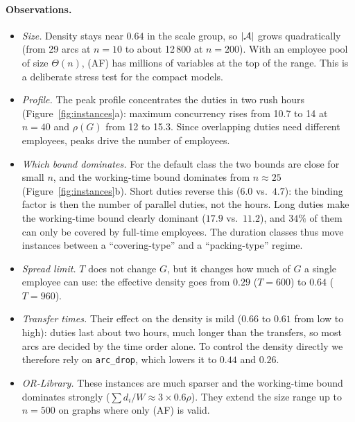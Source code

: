 \paragraph{Observations.}
\begin{itemize}
  \item \emph{Size.} Density stays near $0.64$ in the scale group, so
    $|\mathcal{A}|$ grows quadratically (from 29 arcs at $n=10$ to about 12\,800 at
    $n=200$). With an employee pool of size $\Theta(n)$, (AF) has
    millions of variables at the top of the range. This is a deliberate
    stress test for the compact models.
  \item \emph{Profile.} The peak profile concentrates the duties in two rush
    hours (Figure~\ref{fig:instances}a): maximum concurrency rises from 10.7
    to 14 at $n=40$ and $\rho(G)$ from 12 to 15.3. Since overlapping duties
    need different employees, peaks drive the number of employees.
  \item \emph{Which bound dominates.} For the default class the two bounds
    are close for small $n$, and the working-time bound dominates from
    $n\approx 25$ (Figure~\ref{fig:instances}b). Short duties reverse this
    ($6.0$ vs.\ $4.7$): the binding factor is then the number of parallel
    duties, not the hours. Long duties make the working-time bound clearly
    dominant ($17.9$ vs.\ $11.2$), and $34\%$ of them can only be covered by
    full-time employees. The duration classes thus move instances between a
    ``covering-type'' and a ``packing-type'' regime.
  \item \emph{Spread limit.} $T$ does not change $G$, but it changes how
    much of $G$ a single employee can use: the effective density goes from
    $0.29$ ($T=600$) to $0.64$ ($T=960$).
  \item \emph{Transfer times.} Their effect on the density is mild ($0.66$
    to $0.61$ from low to high): duties last about two hours, much longer
    than the transfers, so most arcs are decided by the time order alone. To
    control the density directly we therefore rely on \texttt{arc\_drop},
    which lowers it to $0.44$ and $0.26$.
  \item \emph{OR-Library.} These instances are much sparser and the
    working-time bound dominates strongly ($\sum d_i/W\approx 3\times
    0.6\rho$). They extend the size range up to $n=500$ on graphs where only
    (AF) is valid.
\end{itemize}

